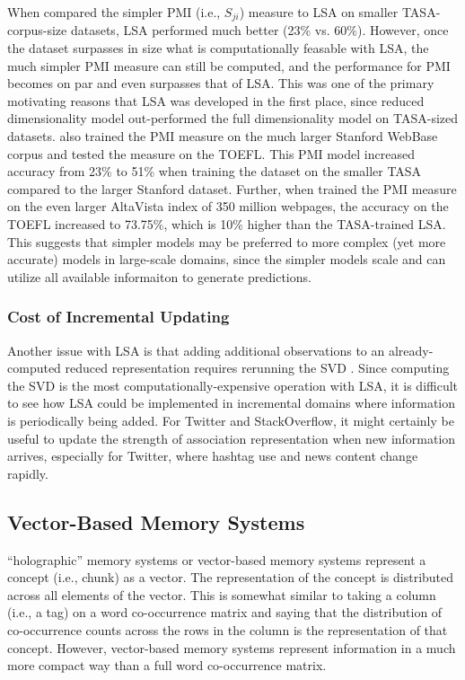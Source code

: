 \documentclass[man,floatsintext]{apa6}
\begin{document}
When \textcite{Budiu2007} compared the simpler PMI (i.e., $S_{ji}$) measure to LSA on smaller TASA-corpus-size datasets, LSA performed much better (23\% vs. 60\%).
However, once the dataset surpasses in size what is computationally feasable with LSA, the much simpler PMI measure can still be computed, and the performance for PMI becomes on par and even surpasses that of LSA.
This was one of the primary motivating reasons that LSA was developed in the first place, since reduced dimensionality model out-performed the full dimensionality model on TASA-sized datasets.
\textcite{Budiu2007} also trained the PMI measure on the much larger Stanford WebBase corpus and tested the measure on the TOEFL.
This PMI model increased accuracy from 23\% to 51\% when training the dataset on the smaller TASA compared to the larger Stanford dataset.
Further, when \textcite{Turney2001} trained the PMI measure on the even larger AltaVista index of 350 million webpages, the accuracy on the TOEFL increased to 73.75\%, which is 10\% higher than the TASA-trained LSA.
This suggests that simpler models may be preferred to more complex (yet more accurate) models in large-scale domains, since the simpler models scale and can utilize all available informaiton to generate predictions.

\subsubsection{Cost of Incremental Updating}

Another issue with LSA is that adding additional observations to an already-computed reduced representation requires rerunning the SVD \textcite{Farahat2004}.
Since computing the SVD is the most computationally-expensive operation with LSA, it is difficult to see how LSA could be implemented in incremental domains where information is periodically being added.
For Twitter and StackOverflow, it might certainly be useful to update the strength of association representation when new information arrives, especially for Twitter, where hashtag use and news content change rapidly.

\subsection{Vector-Based Memory Systems}

``holographic'' memory systems \parencite{Plate1995} or vector-based memory systems represent a concept (i.e., chunk) as a vector.
The representation of the concept is distributed across all elements of the vector.
This is somewhat similar to taking a column (i.e., a tag) on a word co-occurrence matrix and saying that the distribution of co-occurrence counts across the rows in the column is the representation of that concept.
However, vector-based memory systems represent information in a much more compact way than a full word co-occurrence matrix.
\end{document}
